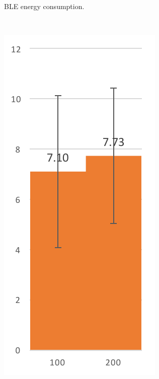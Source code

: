 \documentclass[journal]{vgtc}                %
\begin{document}
\begin{figure}
\begin{subfigure}[b]{0.13\textwidth}
        \caption{BLE energy consumption.}
        \label{fig:ble-high-tp}
    \end{subfigure}
    ~\quad %
    \begin{subfigure}[b]{0.13\textwidth}
        \includegraphics[width=\textwidth]{wifi-high-tp}

\end{subfigure}
\end{figure}
\end{document}
